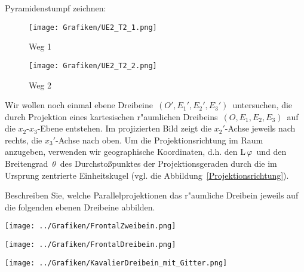 %
\begin{Loesung}
\usetikzlibrary{calc}
	Pyramidenstumpf zeichnen:
	\begin{figure}[H]
		\centering
		\texttt{[image: Grafiken/UE2\_T2\_1.png]}
		\caption{Weg 1}
	\label{fig:T2_1}
	\end{figure}
	\begin{figure}[H]
		\centering
		\texttt{[image: Grafiken/UE2\_T2\_2.png]}
		\caption{Weg 2}
	\label{fig:T2_2}
	\end{figure}
\end{Loesung}
%
\begin{Aufgabe}
\footnotesize
Wir wollen noch einmal ebene Dreibeine\, $(O', E_1', E_2', E_3')$\, untersuchen, die durch Projektion eines kartesischen r"aumlichen Dreibeins\, $(O, E_1, E_2, E_3)$\, auf die $x_2$-$x_3$-Ebene entstehen. Im projizierten Bild zeigt die $x_2'$-Achse jeweils nach rechts, die $x_3'$-Achse nach oben. Um die
Projektionsrichtung im Raum anzugeben, verwenden wir \glqq geographische Koordinaten\grqq, d.h. den L\angengrad \,$\varphi$\, und den Breitengrad  \,$\theta$\, des Durchstoßpunktes der Projektionsgeraden durch die im Ursprung zentrierte Einheitskugel (vgl. die Abbildung~\ref{Projektionsrichtung}).
\small

Beschreiben Sie, welche Parallelprojektionen das r"aumliche Dreibein jeweils auf die folgenden ebenen Dreibeine abbilden.\\
\begin{minipage}{0.33\textwidth}
\texttt{[image: ../Grafiken/FrontalZweibein.png]}
\end{minipage}
\hspace{0.02\textwidth}
\begin{minipage}{0.3\textwidth}
\texttt{[image: ../Grafiken/FrontalDreibein.png]}
\end{minipage}
\hspace{0.02\textwidth}
\begin{minipage}{0.3\textwidth}
\texttt{[image: ../Grafiken/KavalierDreibein\_mit\_Gitter.png]}
\end{minipage}


\end{Aufgabe}
